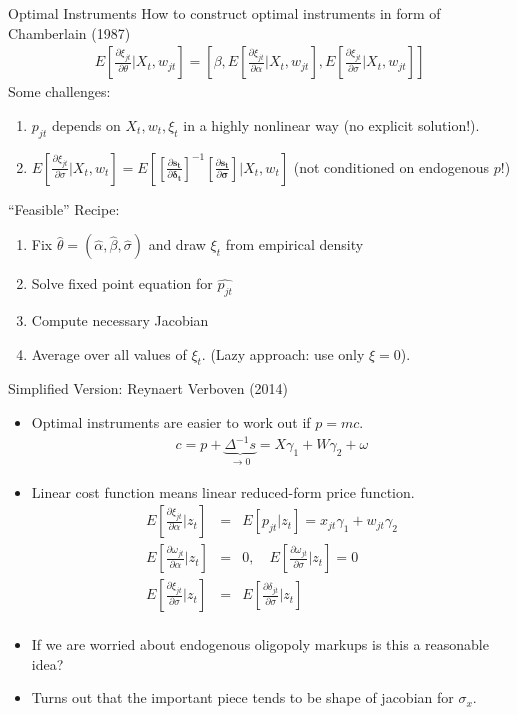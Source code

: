 \documentclass[xcolor=pdftex,dvipsnames,table,mathserif,aspectratio=169]{beamer}
\begin{document}
\begin{frame}{Optimal Instruments}
How to construct optimal instruments in form of Chamberlain (1987)
\begin{eqnarray*}
E\left[\frac{\partial \xi_{jt}}{\partial \theta} | X_t, w_{jt} \right] = \left[\beta, E\left[\frac{\partial \xi_{jt}}{\partial \alpha} | X_t, w_{jt} \right] , E\left[\frac{\partial \xi_{jt}}{\partial \sigma} | X_t, w_{jt} \right] \right]
\end{eqnarray*}
Some challenges:
\begin{enumerate}
\item $p_{jt}$ depends on $X_{t}, w_{t}, \xi_{t}$ in a highly nonlinear way (no explicit solution!).
\item $E[\frac{\partial \xi_{jt}}{\partial \sigma} | X_t, w_{t} ] =E[[\frac{\partial \mathbf{s_t}}{\partial \mathbf{\delta_t}}]^{-1} [\frac{\partial \mathbf{s_t}}{\partial \mathbf{\sigma}}] | X_t, w_{t} ]$  (not conditioned on endogenous $p$!)
\end{enumerate}
``Feasible'' Recipe:
\begin{enumerate}
\item Fix $\hat{\theta}=(\hat{\alpha},\hat{\beta},\hat{\sigma})$ and draw $\xi_t$ from empirical density
\item Solve fixed point equation for $\hat{p_{jt}}$
\item Compute necessary Jacobian
\item Average over all values of $\xi_t$. (Lazy approach: use only $\xi =0$).
\end{enumerate}
\end{frame}


\begin{frame}{Simplified Version: Reynaert Verboven (2014)}
\begin{itemize}
\footnotesize
\item Optimal instruments are easier to work out if $p = mc$.
\begin{eqnarray*}
c = p  + \underbrace{\Delta^{-1} s}_{\rightarrow 0}  = X \gamma_1 + W \gamma_2 + \omega
\end{eqnarray*}
\item Linear cost function means linear reduced-form price function.
\begin{eqnarray*}
E\left[ \frac{\partial \xi_{jt} }{\partial \alpha} | z_t \right] &=& E[p_{jt} | z_t] = x_{jt} \gamma_1 + w_{jt} \gamma_2\\
E\left[ \frac{\partial \omega_{jt} }{\partial \alpha} | z_t \right] &=& 0 , \quad E\left[ \frac{\partial \omega_{jt} }{\partial \sigma} | z_t \right] = 0\\
E\left[ \frac{\partial \xi_{jt} }{\partial \sigma} | z_t \right] &=&E\left[ \frac{\partial \delta_{jt} }{\partial \sigma} | z_t \right]\\
\end{eqnarray*}
\item If we are worried about endogenous oligopoly markups is this a reasonable idea?
\item Turns out that the important piece tends to be \alert{shape} of jacobian for $\sigma_x$.
\end{itemize}
\end{frame}
\end{document}
